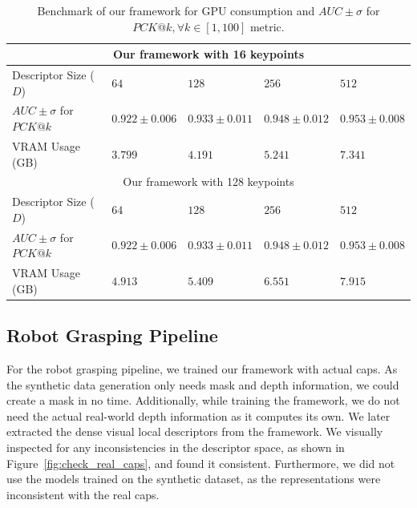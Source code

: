 \begin{table}[htb]
    \caption{Benchmark of our framework for GPU consumption and $AUC \pm \sigma$ for $PCK@k,  \forall k \in [1, 100]$ metric.}
    \label{table:framework_training_results}
    \centering
    \begin{tabular}{lllll}
        \toprule
        \multicolumn{5}{c}{Our framework with 16 keypoints}                                                          \\
        \midrule
        Descriptor Size ($D$)        & $64 $             & $128 $            & $256 $            & $512$             \\
        $AUC \pm \sigma$ for $PCK@k$ & $0.922 \pm 0.006$ & $0.933 \pm 0.011$ & $0.948 \pm 0.012$ & $0.953 \pm 0.008$ \\
        VRAM Usage (GB)              & $3.799 $          & $4.191 $          & $5.241 $          & $7.341$           \\ \hline
        \multicolumn{5}{c}{Our framework with 128 keypoints}                                                         \\
        \midrule
        Descriptor Size ($D$)        & $64 $             & $128 $            & $256 $            & $512$             \\
        $AUC \pm \sigma$ for $PCK@k$ & $0.922 \pm 0.006$ & $0.933 \pm 0.011$ & $0.948 \pm 0.012$ & $0.953 \pm 0.008$ \\
        VRAM Usage (GB)              & $4.913 $          & $5.409 $          & $6.551$           & $7.915$           \\
        \bottomrule
    \end{tabular}
\end{table}


\subsection{Robot Grasping Pipeline}

For the robot grasping pipeline, we trained our framework with actual caps.
As the synthetic data generation only needs mask and depth information, we could create a mask in no time.
Additionally, while training the framework, we do not need the actual real-world depth information as it computes its own.
We later extracted the dense visual local descriptors from the framework.
We visually inspected for any inconsistencies in the descriptor space, as shown in Figure~\ref{fig:check_real_caps},
and found it consistent. Furthermore, we did not use the models trained on the synthetic dataset, as the representations were inconsistent with the real caps.


